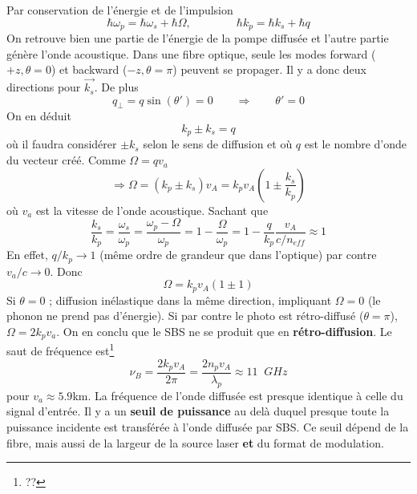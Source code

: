 Par conservation de l'énergie et de l'impulsion
\begin{equation}
\hbar {\omega _p} = \hbar {\omega _s} + \hbar \Omega ,\qquad\qquad
\hbar {k_p} = \hbar {k_s} + \hbar q
\end{equation}
On retrouve bien une partie de l'énergie de la pompe diffusée et l'autre partie génère l'onde
acoustique. Dans une fibre optique, seule les modes forward ($+z, \theta=0$) et 
backward ($-z, \theta=\pi$) peuvent se propager. Il y a donc deux directions pour $\vec{k_s}$. 
De plus
\begin{equation}
q_\perp = q\sin(\theta')= 0\qquad\Rightarrow\qquad \theta'=0
\end{equation}
On en déduit
\begin{equation}
k_p \pm k_s = q
\end{equation}
où il faudra considérer $\pm k_s$ selon le sens de diffusion et où $q$ est le nombre d'onde 
du vecteur créé. Comme $\Omega = qv_a$ 
\begin{equation}
 \Rightarrow \Omega  = ({k_p} \pm {k_s}){v_A} = {k_p}{v_A}(1 \pm \frac{{{k_s}}}{{{k_p}}})
\end{equation}
où $v_a$ est la vitesse de l'onde acoustique. Sachant que
\begin{equation}
\frac{{{k_s}}}{{{k_p}}} = \frac{{{\omega _s}}}{{{\omega _p}}} = \frac{{{\omega _p} - \Omega }}{{{\omega _p}}} = 1 - \frac{\Omega }{{{\omega _p}}} = 1 - \frac{q}{{{k_p}}}\frac{{{v_A}}}{{c/{n_{eff}}}} \approx 1
\end{equation}
En effet, $q/k_p\to 1$ (même ordre de grandeur que dans l'optique) par contre $v_a/c\to0$. Donc
\begin{equation}
\Omega  = {k_p}{v_A}(1 \pm 1)
\end{equation}
Si $\theta=0$ ; diffusion inélastique dans la même direction, impliquant $\Omega=0$ (le phonon
ne prend pas d'énergie). Si par contre le photo est rétro-diffusé ($\theta=\pi$), $\Omega = 
2k_pv_a$. On en conclu que le SBS ne se produit que en \textbf{rétro-diffusion}. Le saut de
fréquence est\footnote{??}
\begin{equation}
{\nu _B} = \frac{{2{k_p}{v_A}}}{{2\pi }} = \frac{{2{n_p}{v_A}}}{{{\lambda _p}}} \approx 11\;\;GHz
\end{equation}
pour $v_a\approx5.9$km. La fréquence de l'onde diffusée est presque identique à celle du signal
d'entrée. Il y a un \textbf{seuil de puissance} au delà duquel presque toute la puissance 
incidente est transférée à l'onde diffusée par SBS. Ce seuil dépend de la fibre, mais aussi
de la largeur de la source laser \textbf{et} du format de modulation.\\

